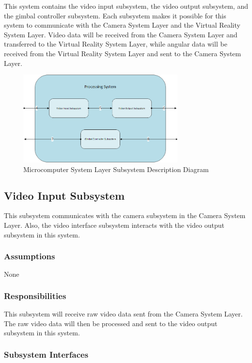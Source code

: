 This system contains the video input subsystem, the video output subsystem, and the gimbal controller subsystem. Each subsystem makes it possible for this system to communicate with the Camera System Layer and the Virtual Reality System Layer. Video data will be received from the Camera System Layer and transferred to the Virtual Reality System Layer, while angular data will be received from the Virtual Reality System Layer and sent to the Camera System Layer.

\begin{figure}[h!]
	\centering
 	\includegraphics[width=0.75\textwidth]{images/processingsubsystem}
 \caption{Microcomputer System Layer Subsystem Description Diagram}
\end{figure}

\subsection{Video Input Subsystem}
This subsystem communicates with the camera subsystem in the Camera System Layer. Also, the video interface subsystem interacts with the video output subsystem in this system.

\subsubsection{Assumptions}
None

\subsubsection{Responsibilities}
This subsystem will receive raw video data sent from the Camera System Layer. The raw video data will then be processed and sent to the video output subsystem in this system.

\subsubsection{Subsystem Interfaces}

